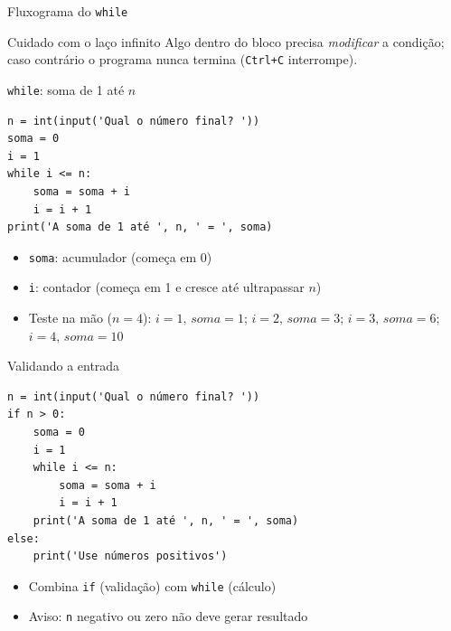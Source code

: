 \documentclass[aspectratio=169,10pt,t]{beamer}
\begin{document}
\begin{frame}{Fluxograma do \texttt{while}}
  \begin{center}
  \end{center}
  \begin{alertblock}{Cuidado com o laço infinito}
    Algo dentro do bloco precisa \emph{modificar} a condição; caso contrário o programa nunca termina (\texttt{Ctrl+C} interrompe).
  \end{alertblock}
\end{frame}

\begin{frame}[fragile]{\texttt{while}: soma de 1 até \(n\)}
\begin{lstlisting}
n = int(input('Qual o número final? '))
soma = 0
i = 1
while i <= n:
    soma = soma + i
    i = i + 1
print('A soma de 1 até ', n, ' = ', soma)
\end{lstlisting}
  \begin{itemize}
    \item \texttt{soma}: \alert{acumulador} (começa em 0)
    \item \texttt{i}: \alert{contador} (começa em 1 e cresce até ultrapassar \(n\))
    \item Teste na mão (\(n=4\)): \(i=1,\,soma=1\); \(i=2,\,soma=3\); \(i=3,\,soma=6\); \(i=4,\,soma=10\)
  \end{itemize}
\end{frame}

\begin{frame}[fragile]{Validando a entrada}
\begin{lstlisting}
n = int(input('Qual o número final? '))
if n > 0:
    soma = 0
    i = 1
    while i <= n:
        soma = soma + i
        i = i + 1
    print('A soma de 1 até ', n, ' = ', soma)
else:
    print('Use números positivos')
\end{lstlisting}
  \begin{itemize}
    \item Combina \texttt{if} (validação) com \texttt{while} (cálculo)
    \item Aviso: \texttt{n} negativo ou zero não deve gerar resultado
  \end{itemize}
\end{frame}
\end{document}
